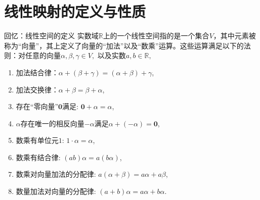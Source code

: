 

\section{线性映射的定义与性质}


\begin{frame}

\begin{block}{回忆：线性空间的定义}
实数域$\mathbb{R}$上的一个线性空间指的是一个集合$V$，其中元素被称为``向量''，其上定义了向量的``加法''以及``数乘''运算。这些运算满足以下的法则：对任意的向量$\alpha,\beta,\gamma \in V,$ 以及实数$a,b \in \mathbb{R},$
\begin{enumerate}
\item 加法结合律：$\alpha + (\beta + \gamma) = (\alpha + \beta) + \gamma$,
\item 加法交换律：$\alpha + \beta = \beta + \alpha$,
\item 存在``零向量''$\mathbf{0}$满足: $\mathbf{0} + \alpha = \alpha$,
\item $\alpha$存在唯一的相反向量$-\alpha$满足$\alpha + (-\alpha) = \mathbf{0}$,
\item 数乘有单位元$1$: $1\cdot\alpha = \alpha$,
\item 数乘有结合律: $(ab)\alpha = a(b\alpha)$,
\item 数乘对向量加法的分配律: $a(\alpha + \beta) = a\alpha + a\beta$,
\item 数量加法对向量的分配律: $(a+b)\alpha = a\alpha + b\alpha$.
\end{enumerate}
\end{block}

\end{frame}


